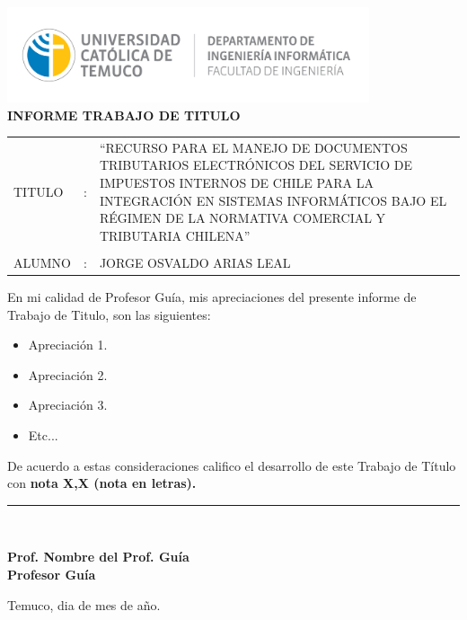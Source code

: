 \begin{center}
\vspace*{-9\baselineskip}
\hspace*{-0.1\textwidth}
\includegraphics[width=0.8\textwidth]{images/Logo_depto_ing_informatica.png}\nonumber\\
\textbf{INFORME  TRABAJO  DE TITULO}
\par\end{center}

\vspace{1cm}

\begin{tabular}{>{\raggedright}p{}>{\raggedright}p{}>{\raggedright}p{}}
TITULO & : & ``RECURSO PARA EL MANEJO DE DOCUMENTOS TRIBUTARIOS ELECTRÓNICOS DEL SERVICIO DE IMPUESTOS INTERNOS DE CHILE PARA LA INTEGRACIÓN EN SISTEMAS INFORMÁTICOS BAJO EL RÉGIMEN DE LA NORMATIVA COMERCIAL Y TRIBUTARIA CHILENA''\tabularnewline
 &  & \tabularnewline
ALUMNO & : & JORGE OSVALDO ARIAS LEAL\tabularnewline
\end{tabular}

\vspace{1cm}

En mi calidad de Profesor Guía, mis apreciaciones del presente informe de Trabajo de Titulo, son las siguientes:
\begin{itemize}
    \item Apreciación 1.
    \item Apreciación 2. 
    \item Apreciación 3.
    \item Etc...
\end{itemize}


De acuerdo a estas consideraciones califico el desarrollo de este Trabajo de Título con \textbf{nota X,X  (nota en letras).}

\vspace{1cm}

\begin{flushright}
\rule{65mm}{0.2mm}\\
\end{flushright} 
\vspace*{-0.1in}  
\hspace*{3.2in} \textbf{Prof. Nombre del Prof. Guía} \\  
\hspace*{3.5in} \textbf{Profesor Guía}

\vspace{1cm}

Temuco, dia de mes de año.



